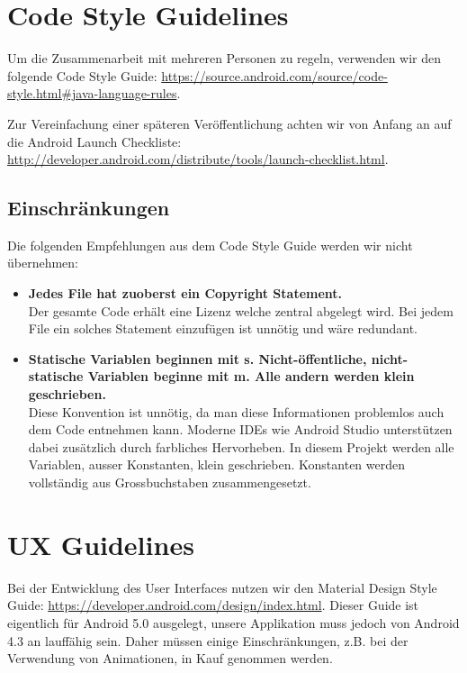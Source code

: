 \section{Code Style Guidelines}
\label{sec:Code Style Guidelines}

Um die Zusammenarbeit mit mehreren Personen zu regeln, verwenden wir den folgende Code Style Guide: \url{https://source.android.com/source/code-style.html#java-language-rules}.

Zur Vereinfachung einer späteren Veröffentlichung achten wir von Anfang an auf die Android Launch Checkliste:\\ \url{http://developer.android.com/distribute/tools/launch-checklist.html}.

\subsection{Einschränkungen}
Die folgenden Empfehlungen aus dem Code Style Guide werden wir nicht übernehmen:

\begin{itemize}
\item \textbf{Jedes File hat zuoberst ein Copyright Statement.} \\ Der gesamte Code erhält eine Lizenz welche zentral abgelegt wird. Bei jedem File ein solches Statement einzufügen ist unnötig und wäre redundant.
\item \textbf{Statische Variablen beginnen mit s. Nicht-öffentliche, nicht-statische Variablen beginne mit m. Alle andern werden klein geschrieben.} \\ Diese Konvention ist unnötig, da man diese Informationen problemlos auch dem Code entnehmen kann. Moderne IDEs wie Android Studio unterstützen dabei zusätzlich durch farbliches Hervorheben. In diesem Projekt werden alle Variablen, ausser Konstanten, klein geschrieben. Konstanten werden vollständig aus Grossbuchstaben zusammengesetzt.
\end{itemize}

\section{UX Guidelines}
\label{sec:UX Guidelines}

Bei der Entwicklung des User Interfaces nutzen wir den Material Design Style Guide:
\url{https://developer.android.com/design/index.html}. Dieser Guide ist eigentlich für Android 5.0 ausgelegt, unsere Applikation muss jedoch von Android 4.3 an lauffähig sein. Daher müssen einige Einschränkungen, z.B. bei der Verwendung von Animationen, in Kauf genommen werden.
